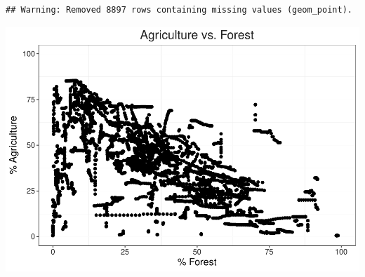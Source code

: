 \documentclass[12pt,]{article}
\begin{document}
\begin{verbatim}
## Warning: Removed 8897 rows containing missing values (geom_point).
\end{verbatim}

\includegraphics{Marx_ENV872_Project_files/figure-latex/unnamed-chunk-4-1.pdf}
\end{document}
